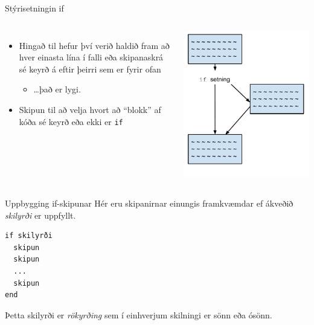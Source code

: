 \documentclass{beamer}
\begin{document}
\begin{frame}{Stýrisetningin if}
\begin{columns}
\begin{itemize}
 \item Hingað til hefur því verið haldið fram að hver einasta lína í falli eða skipanaskrá sé keyrð á eftir þeirri sem er fyrir ofan \pause
 \begin{itemize}
  \item \ldots það er lygi. \pause
 \end{itemize}
 \item Skipun til að velja hvort að ``blokk'' af kóða sé keyrð eða ekki er \texttt{if}
\end{itemize}
\begin{center}
 \includegraphics[width=0.8\linewidth]{Pics/if}
\end{center}
\end{columns}
\end{frame}

\begin{frame}[fragile]{Uppbygging if-skipunar}
\vspace{\baselineskip}
Hér eru skipanirnar einungis framkvæmdar ef ákveðið \emph{skilyrði} er uppfyllt.

\begin{verbatim}
if skilyrði
  skipun
  skipun
  ...
  skipun
end
\end{verbatim} 
Þetta skilyrði er \emph{rökyrðing} sem í einhverjum skilningi er sönn eða ósönn.

\end{frame}
\end{document}
